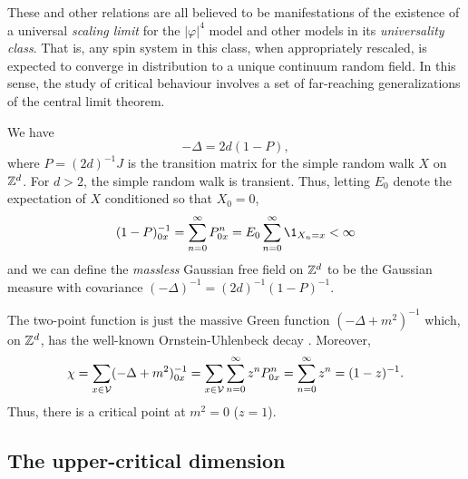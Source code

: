 These and other relations are all believed to be manifestations of the existence of
a universal \emph{scaling limit} for the $|\varphi|^4$ model and other models in its
\emph{universality class}. That is, any spin system in this class, when appropriately
rescaled, is expected to converge in distribution to a unique continuum random field.
In this sense, the study of critical behaviour involves a set of far-reaching
generalizations of the central limit theorem.

\begin{example}

We have
\begin{equation}
-\Delta = 2 d (1 - P),
\end{equation}
where $P = (2 d)^{-1} J$ is the transition matrix for the simple random walk $X$ on ${ {{\mathbb Z}}^d }$.
For $d > 2$, the simple random walk is transient. Thus, letting $E_0$ denote the expectation
of $X$ conditioned so that $X_0 = 0$,
\begin{equation}
(1 - P)^{-1}_{0x} = \sum_{n=0}^\infty P^n_{0x} = E_0 \sum_{n=0}^\infty \1_{X_n=x} < \infty
\end{equation}
and we can define the \emph{massless} Gaussian free field on ${ {{\mathbb Z}}^d }$ to be the Gaussian
measure with covariance $(-\Delta)^{-1} = (2 d)^{-1} (1 - P)^{-1}$.

The two-point function is just the massive Green function
$(-\Delta + m^2)^{-1}$ which, on ${ {{\mathbb Z}}^d }$, has the well-known Ornstein-Uhlenbeck decay . Moreover,
\begin{equation}
\chi
  =
\sum_{x\in\mathcal{V}} (-\Delta + m^2)^{-1}_{0x}
  =
\sum_{x\in\mathcal{V}} \sum_{n=0}^\infty z^n P^n_{0x}
  =
\sum_{n=0}^\infty z^n
  =
(1 - z)^{-1}.
\end{equation}
Thus, there is a critical point at $m^2 = 0$ ($z = 1$).

\end{example}


\subsection{The upper-critical dimension}

